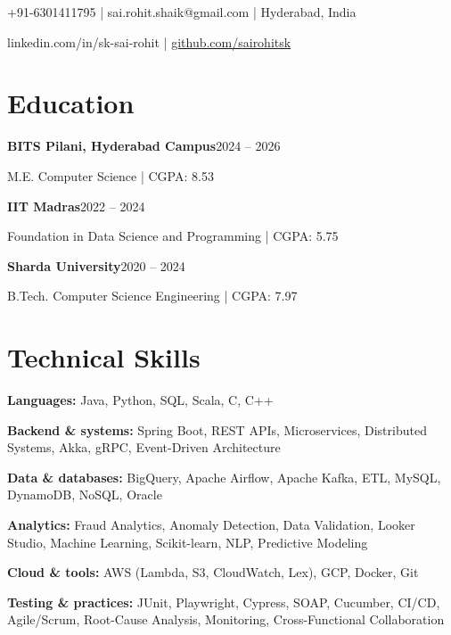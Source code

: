 \documentclass[a4paper,11pt]{article}
\begin{document}
\fontsize{10.5}{13}\selectfont

{\par\vspace{5pt}
+91-6301411795 | sai.rohit.shaik@gmail.com | Hyderabad, India\par\vspace{2pt}
linkedin.com/in/sk-sai-rohit | \href{https://github.com/sairohitsk}{github.com/sairohitsk}\par}
\section{Education}
\textbf{BITS Pilani, Hyderabad Campus}\hfill 2024 -- 2026\par\nopagebreak[4]
M.E. Computer Science | CGPA: 8.53\par\addvspace{2pt}
\textbf{IIT Madras}\hfill 2022 -- 2024\par\nopagebreak[4]
Foundation in Data Science and Programming | CGPA: 5.75\par\addvspace{2pt}
\textbf{Sharda University}\hfill 2020 -- 2024\par\nopagebreak[4]
B.Tech. Computer Science Engineering | CGPA: 7.97\par\addvspace{2pt}
\section{Technical Skills}
\textbf{Languages:} Java, Python, SQL, Scala, C, C++\par\addvspace{2pt}
\textbf{Backend \& systems:} Spring Boot, REST APIs, Microservices, Distributed Systems, Akka, gRPC, Event-Driven Architecture\par\addvspace{2pt}
\textbf{Data \& databases:} BigQuery, Apache Airflow, Apache Kafka, ETL, MySQL, DynamoDB, NoSQL, Oracle\par\addvspace{2pt}
\textbf{Analytics:} Fraud Analytics, Anomaly Detection, Data Validation, Looker Studio, Machine Learning, Scikit-learn, NLP, Predictive Modeling\par\addvspace{2pt}
\textbf{Cloud \& tools:} AWS (Lambda, S3, CloudWatch, Lex), GCP, Docker, Git\par\addvspace{2pt}
\textbf{Testing \& practices:} JUnit, Playwright, Cypress, SOAP, Cucumber, CI/CD, Agile/Scrum, Root-Cause Analysis, Monitoring, Cross-Functional Collaboration\par\addvspace{2pt}
\end{document}
